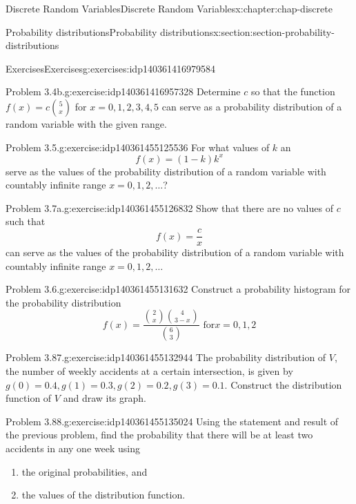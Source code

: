 \documentclass[oneside,10pt,]{book}
\numberwithin{equation}{section}
\begin{document}
\begin{chapterptx}{Discrete Random Variables}{}{Discrete Random Variables}{}{}{x:chapter:chap-discrete}
\begin{sectionptx}{Probability distributions}{}{Probability distributions}{}{}{x:section:section-probability-distributions}
\begin{exercises-subsection}{Exercises}{}{Exercises}{}{}{g:exercises:idp140361416979584}
\begin{divisionexercise}{3}{Problem 3.4b.}{}{g:exercise:idp140361416957328}%
Determine \(c\) so that the function \(\displaystyle f(x) =
c{5\choose x}\) for \(x = 0, 1, 2, 3, 4, 5\) can serve as a probability distribution of a random variable with the given range.%
\end{divisionexercise}%
\begin{divisionexercise}{4}{Problem 3.5.}{}{g:exercise:idp140361455125536}%
For what values of \(k\) an%
\begin{equation*}
f(x) = (1-k)k^x
\end{equation*}
serve as the values of the probability distribution of a random variable with countably infinite range \(x = 0, 1, 2, \dots\)?%
\end{divisionexercise}%
\begin{divisionexercise}{5}{Problem 3.7a.}{}{g:exercise:idp140361455126832}%
Show that there are no values of \(c\) such that%
\begin{equation*}
f(x) =
\dfrac{c}{x}
\end{equation*}
can serve as the values of the probability distribution of a random variable with countably infinite range \(x = 0, 1, 2, \dots\)%
\end{divisionexercise}%
\begin{divisionexercise}{6}{Problem 3.6.}{}{g:exercise:idp140361455131632}%
Construct a probability histogram for the probability distribution%
\begin{equation*}
f(x) = \dfrac{{2\choose x}{4\choose{3-x}}}{{6\choose3}} \text{ for
}x=0, 1, 2
\end{equation*}
%
\end{divisionexercise}%
\begin{divisionexercise}{7}{Problem 3.87.}{}{g:exercise:idp140361455132944}%
The probability distribution of \(V\), the number of weekly accidents at a certain intersection, is given by \(g(0) = 0.4, g(1) =
0.3, g(2) = 0.2, g(3) = 0.1\). Construct the distribution function of \(V\) and draw its graph.%
\end{divisionexercise}%
\begin{divisionexercise}{8}{Problem 3.88.}{}{g:exercise:idp140361455135024}%
Using the statement and result of the previous problem, find the probability that there will be at least two accidents in any one week using%
\begin{enumerate}[label=(\alph*)]
\item{}the original probabilities, and%
\item{}the values of the distribution function.%

\end{enumerate}
\end{divisionexercise}
\end{exercises-subsection}
\end{sectionptx}
\end{chapterptx}
\end{document}
